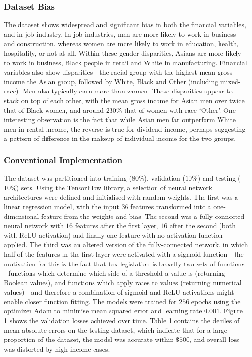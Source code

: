 \documentclass[conference]{IEEEtran}
\begin{document}
\subsubsection{Dataset Bias}
The dataset shows widespread and significant bias in both the financial variables, and in job industry. In job industries, men are more likely to work in business and construction, whereas women are more likely to work in education, health, hospitality, or not at all. Within these gender disparities, Asians are more likely to work in business, Black people in retail and White in manufacturing. Financial variables also show disparities - the racial group with the highest mean gross income the Asian group, followed by White, Black and Other (including mixed-race). Men also typically earn more than women. These disparities appear to stack on top of each other, with the mean gross income for Asian men over twice that of Black women, and around 230\% that of women with race `Other'. One interesting observation is the fact that while Asian men far outperform White men in rental income, the reverse is true for dividend income, perhaps suggesting a pattern of difference in the makeup of individual income for the two groups.
\subsubsection{Conventional Implementation}
The dataset was partitioned into training ($80\%$), validation ($10\%$) and testing ($10\%$) sets. Using the TensorFlow library\cite{tensorflow2015-whitepaper}, a selection of neural network architectures were defined and initialised with random weights. The first was a linear regression model, with the input $36$ features transformed into a one-dimensional feature from the weights and bias. The second was a fully-connected neural network with $16$ features after the first layer, $16$ after the second (both with ReLU\cite{2018arXiv180308375A} activation) and finally one feature with no activation function applied. The third was an altered version of the fully-connected network, in which half of the features in the first layer were activated with a sigmoid function - the motivation for this is the fact that tax legislation is broadly two sets of functions - functions which determine which side of a threshold a value is (returning Boolean values), and functions which apply rates to values (returning numerical values) - and therefore a combination of sigmoid and ReLU activations might enable closer function fitting. The models were trained for $256$ epochs using the optimizer Adam\cite{kingma2017adam} to minimise mean squared error and learning rate $0.001$. Figure 1 shows the validation losses achieved over time. Table 1 contains the deciles of mean absolute errors on the testing dataset, which indicate that for a large proportion of the dataset, the model was accurate within $\$500$, and overall loss was distorted by high-income cases.
\end{document}
